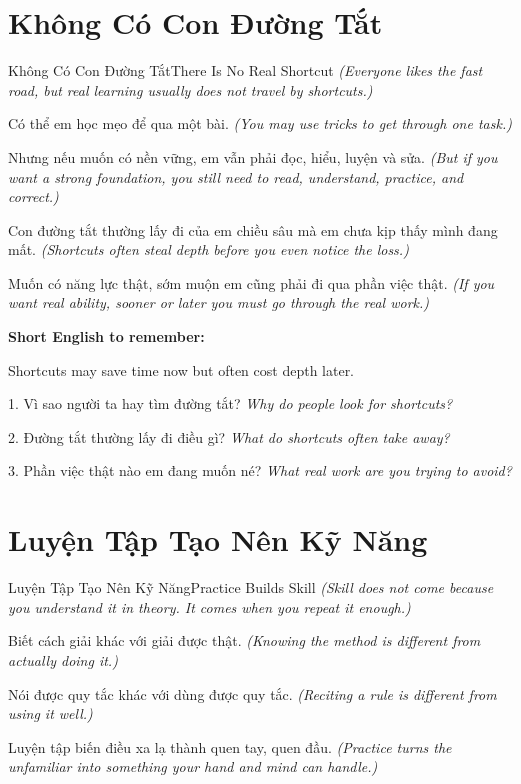 \section{Không Có Con Đường Tắt}
\begin{truyen}{Không Có Con Đường Tắt}{There Is No Real Shortcut}
\textit{(Everyone likes the fast road, but real learning usually does not travel by shortcuts.)}

Có thể em học mẹo để qua một bài.
\textit{(You may use tricks to get through one task.)}

Nhưng nếu muốn có nền vững, em vẫn phải đọc, hiểu, luyện và sửa.
\textit{(But if you want a strong foundation, you still need to read, understand, practice, and correct.)}

Con đường tắt thường lấy đi của em chiều sâu mà em chưa kịp thấy mình đang mất.
\textit{(Shortcuts often steal depth before you even notice the loss.)}
\end{truyen}

\begin{baihoc}
Muốn có năng lực thật, sớm muộn em cũng phải đi qua phần việc thật.
\textit{(If you want real ability, sooner or later you must go through the real work.)}
\end{baihoc}

\begin{ghinhoanh}
\textbf{Short English to remember:}

Shortcuts may save time now but often cost depth later.

\end{ghinhoanh}

\begin{tuhocnhanh}
1. Vì sao người ta hay tìm đường tắt? \textit{Why do people look for shortcuts?}

2. Đường tắt thường lấy đi điều gì? \textit{What do shortcuts often take away?}

3. Phần việc thật nào em đang muốn né? \textit{What real work are you trying to avoid?}
\end{tuhocnhanh}
\ngancach

\section{Luyện Tập Tạo Nên Kỹ Năng}
\begin{truyen}{Luyện Tập Tạo Nên Kỹ Năng}{Practice Builds Skill}
\textit{(Skill does not come because you understand it in theory. It comes when you repeat it enough.)}

Biết cách giải khác với giải được thật.
\textit{(Knowing the method is different from actually doing it.)}

Nói được quy tắc khác với dùng được quy tắc.
\textit{(Reciting a rule is different from using it well.)}

Luyện tập biến điều xa lạ thành quen tay, quen đầu.
\textit{(Practice turns the unfamiliar into something your hand and mind can handle.)}
\end{truyen}


